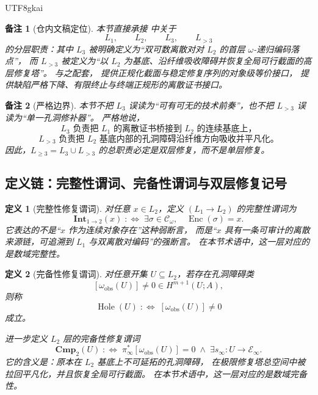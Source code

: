 \documentclass[12pt]{article}
\newtheorem{definition}{定义}[section]
\newtheorem{remark}{备注}[section]
\newcommand{\Hole}{\operatorname{Hole}}
\begin{document}
\begin{CJK*}{UTF8}{gkai}
\begin{remark}[仓内文稿定位]
本节直接承接 \cite{RepoTex41HomotopyRepairBundle} 中关于
\[
  L_1,\qquad L_2,\qquad L_3,\qquad L_{>3}
\]
的分层职责：其中 \(L_3\) 被明确定义为“双可数离散对对 \(L_2\) 的首层 \(\omega\)-递归编码落点”，
而 \(L_{>3}\) 被定义为“以 \(L_2\) 为基底、沿纤维吸收障碍并恢复全局可行截面的高层修复塔”。
与之配套，\cite{RepoTex36HomotopyTwistEquivalence} 提供正规化截面与稳定修复序列的对象级等价接口，
\cite{RepoTex38JacobiBianchiRepair} 提供缺陷严格下降、有限终止与终端正规形的离散证书接口。
\end{remark}

\begin{remark}[严格边界]
本节不把 \(L_3\) 误读为“可有可无的技术前奏”，也不把 \(L_{>3}\) 误读为“单一孔洞修补器”。
严格地说，
\[
  L_3\text{ 负责把 }L_1\text{ 的离散证书桥接到 }L_2\text{ 的连续基底上，}
\]
\[
  L_{>3}\text{ 负责把 }L_2\text{ 基底内部的孔洞障碍沿纤维方向吸收并平凡化。}
\]
因此，\(L_{\ge 3}=L_3\cup L_{>3}\) 的总职责必定是双层修复，而不是单层修复。
\end{remark}

\subsection{定义链：完整性谓词、完备性谓词与双层修复记号}
\label{subsec:tex1-ch11-defs}

\begin{definition}[完整性修复谓词]
\label{def:tex1-ch11-integrity}
对任意 \(x\in L_2\)，定义 \((L_1\to L_2)\) 的完整性谓词为
\[
  \mathbf{Int}_{1\to2}(x)
  \;:\Longleftrightarrow\;
  \exists \sigma\in \mathcal{C}_\omega,\quad \operatorname{Enc}(\sigma)=x.
\]
它表达的不是“\(x\) 作为连续对象存在”这种弱断言，
而是“\(x\) 具有一条可审计的离散来源链，可追溯到 \(L_1\) 与双离散对编码”的强断言。
在本节术语中，这一层对应的是数域完整性。
\end{definition}

\begin{definition}[完备性修复谓词]
\label{def:tex1-ch11-completeness}
对任意开集 \(U\subseteq L_2\)，若存在孔洞障碍类
\[
  [\omega_{\mathrm{obs}}(U)]\neq 0\in H^{m+1}(U;A),
\]
则称
\[
  \Hole(U)
  \;:\Longleftrightarrow\;
  [\omega_{\mathrm{obs}}(U)]\neq 0
\]
成立。

进一步定义 \(L_2\) 层的完备性修复谓词
\[
  \mathbf{Cmp}_{2}(U)
  \;:\Longleftrightarrow\;
  \pi_\infty^\ast[\omega_{\mathrm{obs}}(U)]=0
  \;\wedge\;
  \exists s_\infty:U\to \mathcal E_\infty.
\]
它的含义是：原本在 \(L_2\) 基底上不可延拓的孔洞障碍，
在极限修复塔总空间中被拉回平凡化，并且恢复全局可行截面。
在本节术语中，这一层对应的是数域完备性。
\end{definition}


\end{CJK*}
\end{document}

